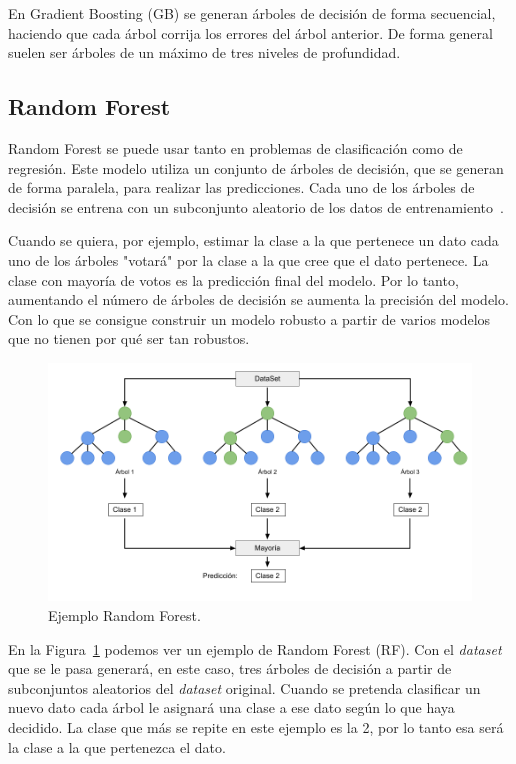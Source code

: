 \documentclass[a4paper, 12pt]{book}
\begin{document}
En Gradient Boosting (GB) se generan árboles de decisión de forma secuencial, haciendo que cada árbol corrija los errores del árbol anterior. De forma general suelen ser árboles de un máximo de tres niveles de profundidad.

\subsection{Random Forest}
\label{subsec:random_forest}

Random Forest se puede usar tanto en problemas de clasificación como de regresión. Este modelo utiliza un conjunto de árboles de decisión, que se generan de forma paralela, para realizar las predicciones. Cada uno de los árboles de decisión se entrena con un subconjunto aleatorio de los datos de entrenamiento~\cite{James2021}. 

Cuando se quiera, por ejemplo, estimar la clase a la que pertenece un dato cada uno de los árboles "votará" por la clase a la que cree que el dato pertenece. La clase con mayoría de votos es la predicción final del modelo. Por lo tanto, aumentando el número de árboles de decisión se aumenta la precisión del modelo. Con lo que se consigue construir un modelo robusto a partir de varios modelos que no tienen por qué ser tan robustos.

\begin{figure}[htb]
  \centering
  \includegraphics[width=14cm, keepaspectratio]{img/ejemplo_randomForest.png}
  \caption{Ejemplo Random Forest.}\label{fig:ejemplo_rforest}
\end{figure}

En la Figura~\ref{fig:ejemplo_rforest} podemos ver un ejemplo de Random Forest (RF). Con el \textit{dataset} que se le pasa generará, en este caso, tres árboles de decisión a partir de subconjuntos aleatorios del \textit{dataset} original. Cuando se pretenda clasificar un nuevo dato cada árbol le asignará una clase a ese dato según lo que haya decidido. La clase que más se repite en este ejemplo es la 2, por lo tanto esa será la clase a la que pertenezca el dato.
\end{document}
